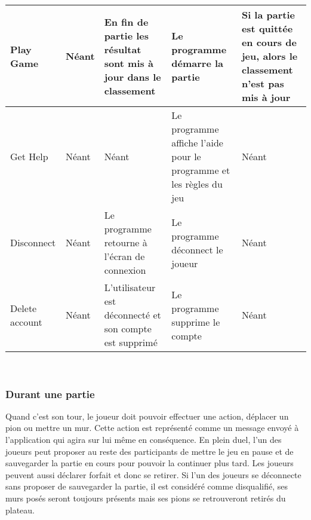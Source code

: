 \documentclass[french, utf8]{article}
\begin{document}
\newpage
\begin{center}
\begin{tabular}{|m{3cm}|m{3cm}|m{3cm}|m{3cm}|m{3cm}|}

\hline Play Game & Néant & En fin de partie les résultat sont mis à jour dans le classement & Le programme démarre la partie & Si la partie est quittée en cours de jeu, alors le classement n'est pas mis à jour \\
\hline Get Help & Néant & Néant & Le programme affiche l'aide pour le programme et les règles du jeu & Néant \\
\hline Disconnect  & Néant & Le programme retourne à l'écran de connexion & Le programme déconnect le joueur & Néant \\
\hline Delete account  & Néant & L'utilisateur est déconnecté et son compte est supprimé & Le programme supprime le compte & Néant \\
\hline
\end{tabular}\\
\end{center}

\subsubsection{Durant une partie}
Quand c'est son tour, le joueur doit pouvoir effectuer une action, déplacer un pion ou mettre un mur. Cette action est représenté comme un message envoyé à l'application qui agira sur lui même en conséquence.
En plein duel, l'un des joueurs peut proposer au reste des participants de mettre le jeu en pause et de sauvegarder la partie en cours pour pouvoir la continuer plus tard. Les joueurs peuvent aussi déclarer forfait et donc se retirer.
Si l'un des joueurs se déconnecte sans proposer de sauvegarder la partie, il est considéré comme disqualifié, ses murs posés seront toujours présents mais ses pions se retrouveront retirés du plateau.
\newline
\end{document}
